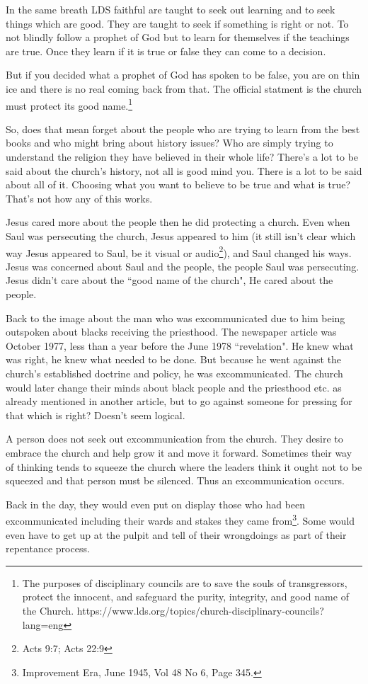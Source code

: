 In the same breath LDS faithful are taught to seek out learning and to seek things
which are good. They are taught to seek if something is right or not. To not blindly
follow a prophet of God but to learn for themselves if the teachings are true. Once
they learn if it is true or false they can come to a decision.

But if you decided what a prophet of God has spoken to be false, you are on thin ice
and there is no real coming back from that. The official statment is the church must
protect its good name.\footnote{
The purposes of disciplinary councils are to save the souls of transgressors, 
protect the innocent, and safeguard the purity, integrity, 
and good name of the Church.
https://www.lds.org/topics/church-disciplinary-councils?lang=eng
}

So, does that mean forget about the people who are trying to learn from the best
books and who might bring about history issues? Who are simply trying to understand
the religion they have believed in their whole life? There's a lot to be said about
the church's history, not all is good mind you. There is a lot to be said about all
of it. Choosing what you want to believe to be true and what is true? That's not how
any of this works.

Jesus cared more about the people then he did protecting a church. Even when Saul was
persecuting the church, Jesus appeared to him (it still isn't clear which way Jesus
appeared to Saul, be it visual or audio\footnote{Acts 9:7; Acts 22:9}), 
and Saul changed his ways. Jesus was concerned about Saul and the people, the people 
Saul was persecuting. Jesus didn't care about the ``good name of the church", He 
cared about the people.

Back to the image about the man who was excommunicated due to him being outspoken
about blacks receiving the priesthood. The newspaper article was October 1977, less
than a year before the June 1978 ``revelation". He knew what was right, he knew what
needed to be done. But because he went against the church's established doctrine and
policy, he was excommunicated. The church would later change their minds about black
people and the priesthood etc. as already mentioned in another article, but to go
against someone for pressing for that which is right? Doesn't seem logical.

A person does not seek out excommunication from the church. They desire to embrace
the church and help grow it and move it forward. Sometimes their way of thinking
tends to squeeze the church where the leaders think it ought not to be squeezed and
that person must be silenced. Thus an excommunication occurs.

Back in the day, they would even put on display those who had been excommunicated
including their wards and stakes they came from\footnote{Improvement Era, June 1945, 
Vol 48 No 6, Page 345.}. Some would even have to get up at the pulpit and tell of 
their wrongdoings as part of their repentance process.